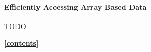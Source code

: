 \documentclass[a4paper,10pt,DIV=12]{scrreprt}
\begin{document}
\paragraph{Efficiently Accessing Array Based Data}
TODO

\hyperlink{toc}{\footnotesize \bf [contents]}

% 
% 
\end{document}
